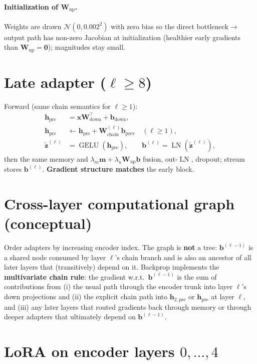 \documentclass[11pt]{article}
\newcommand{\gelu}{\operatorname{GELU}}
\newcommand{\LN}{\operatorname{LN}}
\begin{document}
\paragraph{Initialization of $\bm{W}_{\mathrm{up}}$.}
Weights are drawn $\mathcal{N}(0, 0.002^2)$ with zero bias so the direct bottleneck$\to$output path has non-zero Jacobian at initialization (healthier early gradients than $\bm{W}_{\mathrm{up}}=\bm{0}$); magnitudes stay small.

\section{Late adapter ($\ell \ge 8$)}

Forward (same chain semantics for $\ell\ge 1$):
\begin{align}
  \bm{h}_{\mathrm{pre}} &= \bm{x}\bm{W}_{\mathrm{down}}^\top + \bm{b}_{\mathrm{down}}, \\
  \bm{h}_{\mathrm{pre}} &\leftarrow \bm{h}_{\mathrm{pre}} + \bm{W}_{\mathrm{chain}}^{(\ell)}\bm{b}_{\mathrm{prev}}
  \quad (\ell\ge 1), \\
  \tilde{\bm{z}}^{(\ell)} &= \gelu(\bm{h}_{\mathrm{pre}}), \qquad
  \bm{b}^{(\ell)} = \LN(\tilde{\bm{z}}^{(\ell)}),
\end{align}
then the same memory and $\lambda_m\bm{m}+\lambda_u\bm{W}_{\mathrm{up}}\bm{b}$ fusion, out-$\LN$, dropout; stream stores $\bm{b}^{(\ell)}$. \textbf{Gradient structure matches} the early block.

\section{Cross-layer computational graph (conceptual)}

Order adapters by increasing encoder index. The graph is \textbf{not} a tree: $\bm{b}^{(\ell-1)}$ is a shared node consumed by layer $\ell$'s chain branch and is also an ancestor of all later layers that (transitively) depend on it. Backprop implements the \textbf{multivariate chain rule}: the gradient w.r.t.\ $\bm{b}^{(\ell-1)}$ is the sum of contributions from (i) the usual path through the encoder trunk into layer $\ell$'s down projections and (ii) the explicit chain path into $\bm{h}_{2,\mathrm{pre}}$ or $\bm{h}_{\mathrm{pre}}$ at layer $\ell$, and (iii) any later layers that routed gradients back through memory or through deeper adapters that ultimately depend on $\bm{b}^{(\ell-1)}$.

\section{LoRA on encoder layers $0,\ldots,4$}
\end{document}
